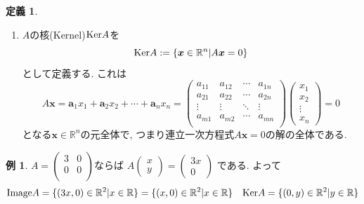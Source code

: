 \documentclass[dvipdfmx,a4paper,11pt]{article}
\newcommand{\R}{\mathbb{R}}
\theoremstyle{definition}
\newtheorem{dfn}[thm]{定義}
\newtheorem{exa}[thm]{例}
\begin{document}
\begin{tcolorbox}[
    colback = white,
    colframe = green!35!black,
    fonttitle = \bfseries,
    breakable = true]
\begin{dfn}
\begin{enumerate}
\begin{align*}
\begin{split}
\begin{pmatrix}
x_1\\x_2\\ \vdots \\x_n
\end{pmatrix}
&=
    \begin{pmatrix}
    \bm{a}_1&\bm{a}_2&\cdots&\bm{a}_n
    \end{pmatrix}
    \begin{pmatrix}
x_1\\x_2\\ \vdots \\x_n
\end{pmatrix}\\
&=
\bm{a}_1x_1+ \bm{a}_2x_2 + \cdots + \bm{a}_nx_n
  \end{split}
  \end{align*}

  と表される元の全体である. 
  \item  $A$の核(Kernel)${\rm  Ker}A$を
  $$
{\rm  Ker}A:= \{ \bm{x} \in \R^n | A\bm{x}=0\}
  $$
 として定義する. これは
 $$
   A\bm{x}=
   \bm{a}_1x_1+ \bm{a}_2x_2 + \cdots + \bm{a}_nx_n
   =
   \begin{pmatrix}
a_{11}& a_{12} & \cdots &a_{1n} \\
a_{21}& a_{22} & \cdots &a_{2n} \\
\vdots& \vdots	&	\ddots   &	\vdots \\
a_{m1}& a_{m2} & \cdots &a_{mn} \\
\end{pmatrix}
\begin{pmatrix}
x_1\\x_2\\ \vdots \\x_n
\end{pmatrix}
=0
 $$
 となる$\bm{x} \in \R^n$の元全体で, つまり連立一次方程式$A\bm{x}=0$の解の全体である. 
  \end{enumerate}
  \end{dfn}
  \end{tcolorbox}
  
   \begin{exa}
$
A=\begin{pmatrix}
3& 0 \\
0& 0 \\
\end{pmatrix}
$ならば
$
 A
\begin{pmatrix}
x \\ y
 \end{pmatrix}  = 
 \begin{pmatrix}
3x \\0
 \end{pmatrix}
$
である. 
よって
$$
{\rm  Image}A
=
\{ (3x,0) \in \R^2 | x \in \R\}
=
\{ (x,0) \in \R^2 | x \in \R\}
\quad
{\rm  Ker}A
=
\{ (0,y) \in \R^2 | y \in \R\}
$$
\end{exa}
\end{document}
